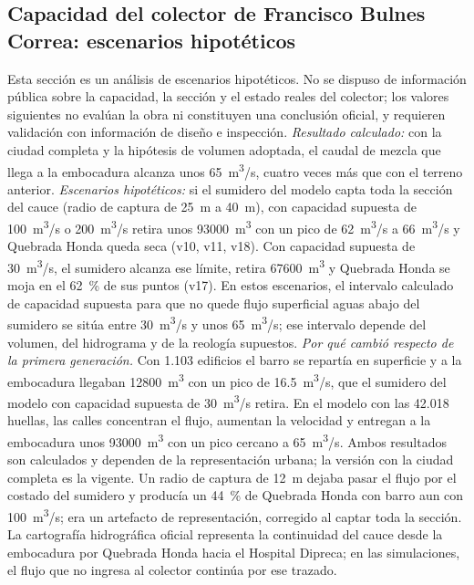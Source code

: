 \subsection{Capacidad del colector de Francisco Bulnes Correa: escenarios hipotéticos}\label{sec:res-colector}
Esta sección es un análisis de escenarios hipotéticos. No se dispuso de información pública sobre la capacidad, la sección y el estado reales del colector; los valores siguientes no evalúan la obra ni constituyen una conclusión oficial, y requieren validación con información de diseño e inspección. \emph{Resultado calculado:} con la ciudad completa y la hipótesis de volumen adoptada, el caudal de mezcla que llega a la embocadura alcanza unos \SI{65}{m^3/s}, cuatro veces más que con el terreno anterior. \emph{Escenarios hipotéticos:} si el sumidero del modelo capta toda la sección del cauce (radio de captura de \SI{25}{m} a \SI{40}{m}), con capacidad supuesta de \SI{100}{m^3/s} o \SI{200}{m^3/s} retira unos \SI{93000}{m^3} con un pico de \SI{62}{m^3/s} a \SI{66}{m^3/s} y Quebrada Honda queda seca (v10, v11, v18). Con capacidad supuesta de \SI{30}{m^3/s}, el sumidero alcanza ese límite, retira \SI{67600}{m^3} y Quebrada Honda se moja en el \SI{62}{\percent} de sus puntos (v17). En estos escenarios, el intervalo calculado de capacidad supuesta para que no quede flujo superficial aguas abajo del sumidero se sitúa entre \SI{30}{m^3/s} y unos \SI{65}{m^3/s}; ese intervalo depende del volumen, del hidrograma y de la reología supuestos. \emph{Por qué cambió respecto de la primera generación.} Con 1.103 edificios el barro se repartía en superficie y a la embocadura llegaban \SI{12800}{m^3} con un pico de \SI{16,5}{m^3/s}, que el sumidero del modelo con capacidad supuesta de \SI{30}{m^3/s} retira. En el modelo con las 42.018 huellas, las calles concentran el flujo, aumentan la velocidad y entregan a la embocadura unos \SI{93000}{m^3} con un pico cercano a \SI{65}{m^3/s}. Ambos resultados son calculados y dependen de la representación urbana; la versión con la ciudad completa es la vigente. Un radio de captura de \SI{12}{m} dejaba pasar el flujo por el costado del sumidero y producía un \SI{44}{\percent} de Quebrada Honda con barro aun con \SI{100}{m^3/s}; era un artefacto de representación, corregido al captar toda la sección. La cartografía hidrográfica oficial representa la continuidad del cauce desde la embocadura por Quebrada Honda hacia el Hospital Dipreca; en las simulaciones, el flujo que no ingresa al colector continúa por ese trazado.

